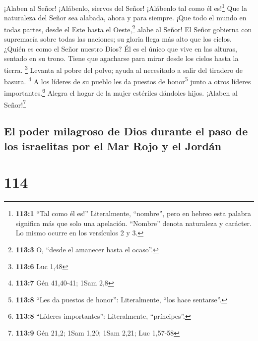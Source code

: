  ¡Alaben al Señor! ¡Alábenlo, siervos del Señor! ¡Alábenlo
tal como él es!\footnote{\textbf{113:1} ``Tal como él es!''
  Literalmente, ``nombre'', pero en hebreo esta palabra significa más
  que solo una apelación. ``Nombre'' denota naturaleza y carácter. Lo
  mismo ocurre en los versículos 2 y 3.}  Que la
naturaleza del Señor sea alabada, ahora y para siempre. 
¡Que todo el mundo en todas partes, desde el Este hasta el
Oeste,\footnote{\textbf{113:3} O, ``desde el amanecer hasta el ocaso''.}
alabe al Señor!  El Señor gobierna con supremacía sobre
todas las naciones; su gloria llega más alto que los cielos.
 ¿Quién es como el Señor nuestro Dios? Él es el único que
vive en las alturas, sentado en su trono.  Tiene que
agacharse para mirar desde los cielos hasta la tierra. \footnote{\textbf{113:6}
  Luc 1,48}  Levanta al pobre del polvo; ayuda al
necesitado a salir del tiradero de basura. \footnote{\textbf{113:7} Gén
  41,40-41; 1Sam 2,8}  A los líderes de su pueblo les da
puestos de honor\footnote{\textbf{113:8} ``Les da puestos de honor'':
  Literalmente, ``los hace sentarse''.} junto a otros líderes
importantes.\footnote{\textbf{113:8} ``Líderes importantes'':
  Literalmente, ``príncipes''.}  Alegra el hogar de la
mujer estériles dándoles hijos. ¡Alaben al Señor!\footnote{\textbf{113:9}
  Gén 21,2; 1Sam 1,20; 1Sam 2,21; Luc 1,57-58}

\hypertarget{el-poder-milagroso-de-dios-durante-el-paso-de-los-israelitas-por-el-mar-rojo-y-el-jorduxe1n}{%
\subsection{El poder milagroso de Dios durante el paso de los israelitas
por el Mar Rojo y el
Jordán}\label{el-poder-milagroso-de-dios-durante-el-paso-de-los-israelitas-por-el-mar-rojo-y-el-jorduxe1n}}

\hypertarget{section-113}{%
\section{114}\label{section-113}}

